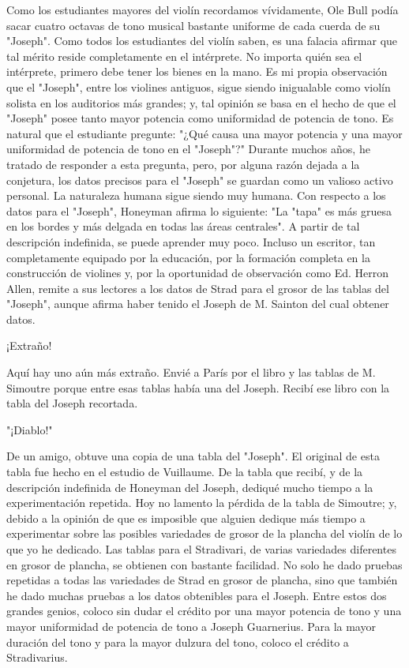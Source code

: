 \documentclass[12pt]{book}
\begin{document}
Como los estudiantes mayores del violín recordamos vívidamente, Ole Bull podía sacar cuatro octavas de tono musical bastante uniforme de cada cuerda de su "Joseph". Como todos los estudiantes del violín saben, es una falacia afirmar que tal mérito reside completamente en el intérprete. No importa quién sea el intérprete, primero debe tener los bienes en la mano. Es mi propia observación que el "Joseph", entre los violines antiguos, sigue siendo inigualable como violín solista en los auditorios más grandes; y, tal opinión se basa en el hecho de que el "Joseph" posee tanto mayor potencia como uniformidad de potencia de tono. Es natural que el estudiante pregunte: "¿Qué causa una mayor potencia y una mayor uniformidad de potencia de tono en el "Joseph"?" Durante muchos años, he tratado de responder a esta pregunta, pero, por alguna razón dejada a la conjetura, los datos precisos para el "Joseph" se guardan como un valioso activo personal. La naturaleza humana sigue siendo muy humana. Con respecto a los datos para el "Joseph", Honeyman afirma lo siguiente: "La "tapa" es más gruesa en los bordes y más delgada en todas las áreas centrales". A partir de tal descripción indefinida, se puede aprender muy poco. Incluso un escritor, tan completamente equipado por la educación, por la formación completa en la construcción de violines y, por la oportunidad de observación como Ed. Herron Allen, remite a sus lectores a los datos de Strad para el grosor de las tablas del "Joseph", aunque afirma haber tenido el Joseph de M. Sainton del cual obtener datos.

¡Extraño!

Aquí hay uno aún más extraño. Envié a París por el libro y las tablas de M. Simoutre porque entre esas tablas había una del Joseph. Recibí ese libro con la tabla del Joseph recortada.

"¡Diablo!"

De un amigo, obtuve una copia de una tabla del "Joseph". El original de esta tabla fue hecho en el estudio de Vuillaume. De la tabla que recibí, y de la descripción indefinida de Honeyman del Joseph, dediqué mucho tiempo a la experimentación repetida. Hoy no lamento la pérdida de la tabla de Simoutre; y, debido a la opinión de que es imposible que alguien dedique más tiempo a experimentar sobre las posibles variedades de grosor de la plancha del violín de lo que yo he dedicado. Las tablas para el Stradivari, de varias variedades diferentes en grosor de plancha, se obtienen con bastante facilidad. No solo he dado pruebas repetidas a todas las variedades de Strad en grosor de plancha, sino que también he dado muchas pruebas a los datos obtenibles para el Joseph. Entre estos dos grandes genios, coloco sin dudar el crédito por una mayor potencia de tono y una mayor uniformidad de potencia de tono a Joseph Guarnerius. Para la mayor duración del tono y para la mayor dulzura del tono, coloco el crédito a Stradivarius.
\end{document}

